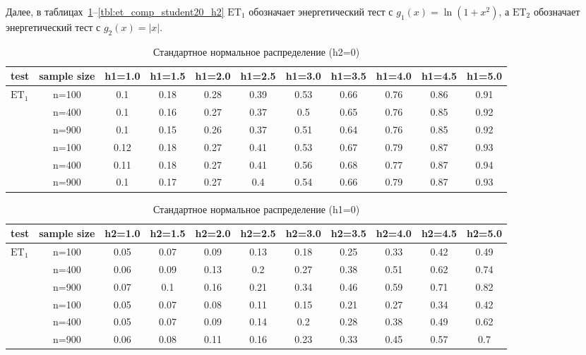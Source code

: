 \documentclass[12pt]{article}
\theoremstyle{break}
\begin{document}
\clearpage
Далее, в таблицах~\ref{tbl:et_comp_normal_h1}--\ref{tbl:et_comp_student20_h2} $\text{ET}_1$ обозначает энергетический 
тест с $g_1(x) = \ln(1+x^2)$, а $\text{ET}_2$ обозначает энергетический тест с $g_2(x) = |x|$.


\begin{table}[!h]
	\centering
	\caption{Стандартное нормальное распределение (h2=0)}
	\begin{tabular}{l c c c c c c c c c c} 
		\toprule
		test & sample size & h1=1.0 & h1=1.5 & h1=2.0 & h1=2.5 & h1=3.0 & h1=3.5 & h1=4.0 & h1=4.5 & h1=5.0 \\ 
		\midrule
		\multirow{3}{*}{$\text{ET}_1$} 
		& n=100 & 0.1 & 0.18 & 0.28 & 0.39 & 0.53 & 0.66 & 0.76 & 0.86 & 0.91 \\ 
		& n=400 & 0.1 & 0.16 & 0.27 & 0.37 & 0.5 & 0.65 & 0.76 & 0.85 & 0.92 \\ 
		& n=900 & 0.1 & 0.15 & 0.26 & 0.37 & 0.51 & 0.64 & 0.76 & 0.85 & 0.92 \\ 
		\addlinespace
		\addlinespace
		\multirow{3}{*}{$\text{ET}_2$} 
		& n=100 & 0.12 & 0.18 & 0.27 & 0.41 & 0.53 & 0.67 & 0.79 & 0.87 & 0.93 \\ 
		& n=400 & 0.11 & 0.18 & 0.27 & 0.41 & 0.56 & 0.68 & 0.77 & 0.87 & 0.94 \\ 
		& n=900 & 0.1 & 0.17 & 0.27 & 0.4 & 0.54 & 0.66 & 0.79 & 0.87 & 0.93 \\ 
		\bottomrule
	\end{tabular}
	\label{tbl:et_comp_normal_h1}
\end{table}


\begin{table}[!h]
	\centering
	\caption{Стандартное нормальное распределение (h1=0)}
	\begin{tabular}{l c c c c c c c c c c} 
		\toprule
		test & sample size & h2=1.0 & h2=1.5 & h2=2.0 & h2=2.5 & h2=3.0 & h2=3.5 & h2=4.0 & h2=4.5 & h2=5.0 \\ 
		\midrule
		\multirow{3}{*}{$\text{ET}_1$} 
		& n=100 & 0.05 & 0.07 & 0.09 & 0.13 & 0.18 & 0.25 & 0.33 & 0.42 & 0.49 \\ 
		& n=400 & 0.06 & 0.09 & 0.13 & 0.2 & 0.27 & 0.38 & 0.51 & 0.62 & 0.74 \\ 
		& n=900 & 0.07 & 0.1 & 0.16 & 0.21 & 0.34 & 0.46 & 0.59 & 0.71 & 0.82 \\ 
		\addlinespace
		\addlinespace
		\multirow{3}{*}{$\text{ET}_2$} 
		& n=100 & 0.05 & 0.07 & 0.08 & 0.11 & 0.15 & 0.21 & 0.27 & 0.34 & 0.42 \\ 
		& n=400 & 0.05 & 0.07 & 0.09 & 0.14 & 0.2 & 0.28 & 0.38 & 0.49 & 0.62 \\ 
		& n=900 & 0.06 & 0.08 & 0.11 & 0.16 & 0.23 & 0.33 & 0.45 & 0.57 & 0.7 \\ 
		\bottomrule
	\end{tabular}
	\label{tbl:et_comp_normal_h2}
\end{table}
\end{document}
